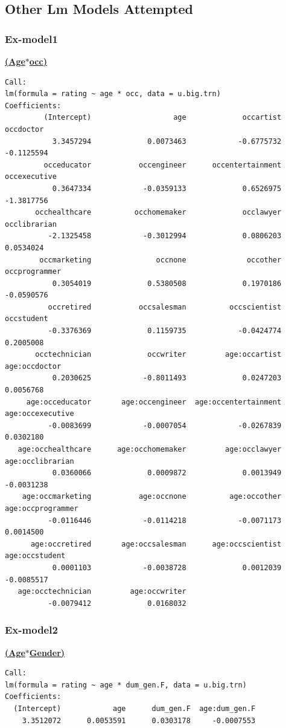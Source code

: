 \documentclass[11pt]{article}
\begin{document}
\subsection{Other Lm Models Attempted}
\subsubsection{Ex-model1}
\textbf{\underline{(Age$*$occ)}}
\begin{verbatim}
Call:
lm(formula = rating ~ age * occ, data = u.big.trn)
Coefficients:
         (Intercept)                   age             occartist             occdoctor  
           3.3457294             0.0073463            -0.6775732            -0.1125594  
         occeducator           occengineer      occentertainment          occexecutive  
           0.3647334            -0.0359133             0.6526975            -1.3817756  
       occhealthcare          occhomemaker             occlawyer          occlibrarian  
          -2.1325458            -0.3012994             0.0806203             0.0534024  
        occmarketing               occnone              occother         occprogrammer  
           0.3054019             0.5380508             0.1970186            -0.0590576  
          occretired           occsalesman          occscientist            occstudent  
          -0.3376369             0.1159735            -0.0424774             0.2005008  
       occtechnician             occwriter         age:occartist         age:occdoctor  
           0.2030625            -0.8011493             0.0247203             0.0056768  
     age:occeducator       age:occengineer  age:occentertainment      age:occexecutive  
          -0.0083699            -0.0007054            -0.0267839             0.0302180  
   age:occhealthcare      age:occhomemaker         age:occlawyer      age:occlibrarian  
           0.0360066             0.0009872             0.0013949            -0.0031238  
    age:occmarketing           age:occnone          age:occother     age:occprogrammer  
          -0.0116446            -0.0114218            -0.0071173             0.0014500  
      age:occretired       age:occsalesman      age:occscientist        age:occstudent  
           0.0001103            -0.0038728             0.0012039            -0.0085517  
   age:occtechnician         age:occwriter  
          -0.0079412             0.0168032  
\end{verbatim}

\subsubsection{Ex-model2}
\textbf{\underline{(Age$*$Gender)}}
\begin{verbatim}
Call:
lm(formula = rating ~ age * dum_gen.F, data = u.big.trn)
Coefficients:
  (Intercept)            age      dum_gen.F  age:dum_gen.F  
    3.3512072      0.0053591      0.0303178     -0.0007553 
\end{verbatim}
\end{document}
